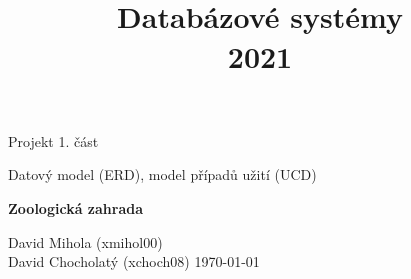 \documentclass[]{fitiel} %
\title{\logo\\ \huge{Databázové systémy} \\ 2021}
\date{}
\begin{document}
	\maketitle
\thispagestyle{empty}

\begin{center}
    \huge Projekt 1. část
\end{center}
\begin{center}
    \huge Datový model (ERD), model případů užití (UCD)
\end{center}
\begin{center}
    \huge \textbf{Zoologická zahrada}
\end{center}
\null
\vfill
    \LARGE{David Mihola (xmihol00)} \hspace*{\fill} \\
    \LARGE{David Chocholatý (xchoch08)} \hspace*{\fill} \today

    
    
    
    

\newpage


 
 

	
\end{document}
